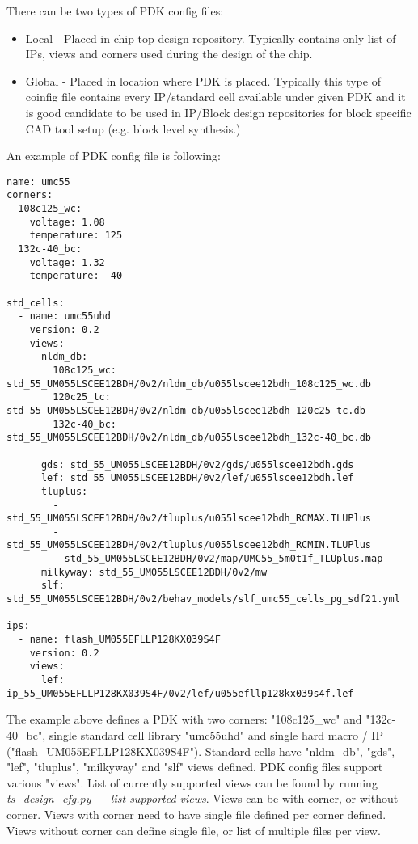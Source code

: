 \documentclass{tropic_design_spec}
\begin{document}
There can be two types of PDK config files:
\begin{itemize}
    \item{Local - Placed in chip top design repository. Typically contains only list of IPs,
                  views and corners used during the design of the chip.}
    \item{Global - Placed in location where PDK is placed. Typically this type of coinfig
                   file contains every IP/standard cell available under given PDK and it
                   is good candidate to be used in IP/Block design repositories for block
                   specific CAD tool setup (e.g. block level synthesis.)} 
\end{itemize}

An example of PDK config file is following:

\begin{lstlisting}[basicstyle=\footnotesize]
name: umc55
corners:
  108c125_wc:
    voltage: 1.08
    temperature: 125
  132c-40_bc:
    voltage: 1.32
    temperature: -40

std_cells:
  - name: umc55uhd
    version: 0.2
    views:
      nldm_db:
        108c125_wc: std_55_UM055LSCEE12BDH/0v2/nldm_db/u055lscee12bdh_108c125_wc.db
        120c25_tc: std_55_UM055LSCEE12BDH/0v2/nldm_db/u055lscee12bdh_120c25_tc.db
        132c-40_bc: std_55_UM055LSCEE12BDH/0v2/nldm_db/u055lscee12bdh_132c-40_bc.db

      gds: std_55_UM055LSCEE12BDH/0v2/gds/u055lscee12bdh.gds
      lef: std_55_UM055LSCEE12BDH/0v2/lef/u055lscee12bdh.lef
      tluplus:
        - std_55_UM055LSCEE12BDH/0v2/tluplus/u055lscee12bdh_RCMAX.TLUPlus
        - std_55_UM055LSCEE12BDH/0v2/tluplus/u055lscee12bdh_RCMIN.TLUPlus
        - std_55_UM055LSCEE12BDH/0v2/map/UMC55_5m0t1f_TLUplus.map
      milkyway: std_55_UM055LSCEE12BDH/0v2/mw
      slf: std_55_UM055LSCEE12BDH/0v2/behav_models/slf_umc55_cells_pg_sdf21.yml

ips:
  - name: flash_UM055EFLLP128KX039S4F
    version: 0.2
    views: 
      lef: ip_55_UM055EFLLP128KX039S4F/0v2/lef/u055efllp128kx039s4f.lef
\end{lstlisting}

The example above defines a PDK with two corners: "108c125_wc" and "132c-40_bc", single
standard cell library "umc55uhd" and single hard macro / IP \newline ("flash_UM055EFLLP128KX039S4F").
Standard cells have "nldm_db", "gds", "lef", "tluplus", "milkyway" and "slf" views defined.
PDK config files support various "views". List of currently supported views can be found
by running \textit{ts_design_cfg.py ----list-supported-views}. Views can be with corner,
or without corner. Views with corner need to have single file defined per corner
defined. Views without corner can define single file, or list of multiple files per view.
\end{document}
